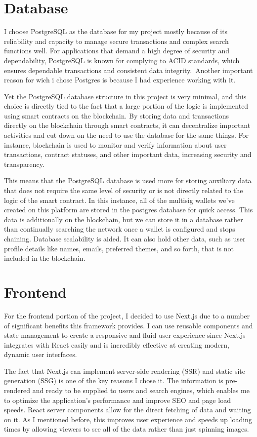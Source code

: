 \section{Database}
\label{ch4sec4}
I choose PostgreSQL as the database for my project mostly because of its reliability and capacity to manage secure transactions and complex search functions well. For applications that demand a high degree of security and dependability, PostgreSQL is known for complying to ACID standards, which ensures dependable transactions and consistent data integrity. Another important reason for wich i chose Postgres is because I had experience working with it.
\par Yet the PostgreSQL database structure in this project is very minimal, and this choice is directly tied to the fact that a large portion of the  logic is implemented using smart contracts on the blockchain. By storing data and transactions directly on the blockchain through smart contracts, it can decentralize important activities and cut down on the need to use the database for the same things. For instance, blockchain is used to monitor and verify information about user transactions, contract statuses, and other important data, increasing security and transparency.
\par This means that the PostgreSQL database is used more for storing auxiliary data that does not require the same level of security or is not directly related to the logic of the smart contract. In this instance, all of the multisig wallets we've created on this platform are stored in the postgres database for quick access. This data is additionally on the blockchain, but we can store it in a database rather than continually searching the network once a wallet is configured and stops chaining. Database scalability is aided. It can also hold other data, such as user profile details like names, emails, preferred themes, and so forth, that is not included in the blockchain.
\section{Frontend}
\label{ch4sec5}
\par For the frontend portion of the project, I decided to use Next.js due to a number of significant benefits this framework provides. I can use reusable components and state management to create a responsive and fluid user experience since Next.js integrates with React easily and is incredibly effective at creating modern, dynamic user interfaces.
\par The fact that Next.js can implement server-side rendering (SSR) and static site generation (SSG) is one of the key reasons I chose it. The information is pre-rendered and ready to be supplied to users and search engines, which enables me to optimize the application's performance and improve SEO and page load speeds. React server components allow for the direct fetching of data and waiting on it. As I mentioned before, this improves user experience and speeds up loading times by allowing viewers to see all of the data rather than just spinning images. 

